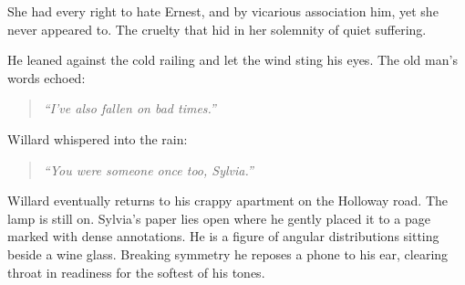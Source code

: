 She had every right to hate Ernest, and by vicarious association him, yet she never appeared to. The cruelty that hid in her solemnity of quiet suffering.

He leaned against the cold railing and let the wind sting his eyes. The old man's words echoed:
\begin{quote}
\emph{``I’ve also fallen on bad times.''}
\end{quote}

Willard whispered into the rain:
\begin{quote}
\emph{``You were someone once too, Sylvia.''}
\end{quote}


Willard eventually returns to his crappy apartment on the Holloway road. The lamp is still on. Sylvia’s paper lies open where he gently placed it to a page marked with dense annotations. He is a figure of angular distributions sitting beside a wine glass.  Breaking symmetry he reposes a phone to his ear, clearing throat in readiness for the softest of his tones.

